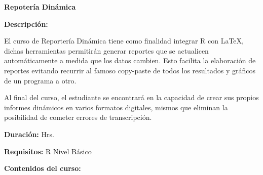 \documentclass[12pt,a4paper,oneside]{article}\usepackage[]{graphicx}\usepackage[]{color}
\begin{document}

\newpage

\begin{center}
{\bf \Large Repotería Dinámica}
\end{center}

{\bf \large Descripción:}\newline
  
  El curso de Reportería Dinámica tiene como finalidad integrar R con LaTeX, dichas herramientas permitirán generar reportes que se actualicen automáticamente a medida que los datos cambien. Esto facilita la elaboración de reportes evitando recurrir al famoso copy-paste de todos los resultados y gráficos de un programa a otro.\newline
  
  Al final del curso, el estudiante se encontrará en la capacidad de crear sus propios informes dinámicos en varios formatos digitales, mismos que eliminan la posibilidad de cometer errores de transcripción. \newline
  
{\bf \large Duración:} Hrs.
  
{\bf \large Requisitos:}\newline
  R Nivel Básico
  
{\bf \large Contenidos del curso:}
\end{document}

